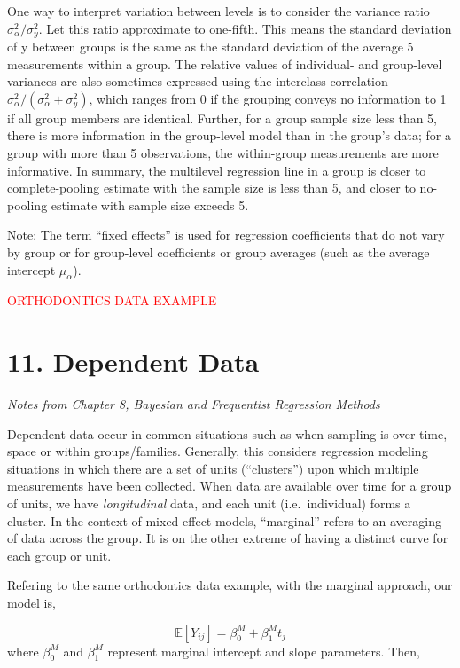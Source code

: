 \documentclass[12pt,]{article}
\begin{document}
One way to interpret variation between levels is to consider the
variance ratio \(\sigma_\alpha^2/ \sigma^2_y\). Let this ratio
approximate to one-fifth. This means the standard deviation of y between
groups is the same as the standard deviation of the average 5
measurements within a group. The relative values of individual- and
group-level variances are also sometimes expressed using the interclass
correlation \(\sigma^2_\alpha / (\sigma^2_\alpha + \sigma^2_y)\), which
ranges from 0 if the grouping conveys no information to 1 if all group
members are identical. Further, for a group sample size less than 5,
there is more information in the group-level model than in the group's
data; for a group with more than 5 observations, the within-group
measurements are more informative. In summary, the multilevel regression
line in a group is closer to complete-pooling estimate with the sample
size is less than 5, and closer to no-pooling estimate with sample size
exceeds 5.

Note: The term ``fixed effects'' is used for regression coefficients
that do not vary by group or for group-level coefficients or group
averages (such as the average intercept \(\mu_\alpha\)).

\textcolor{red}{ORTHODONTICS DATA EXAMPLE}

\section{11. Dependent Data}\label{dependent-data}

\emph{Notes from Chapter 8, Bayesian and Frequentist Regression Methods}

Dependent data occur in common situations such as when sampling is over
time, space or within groups/families. Generally, this considers
regression modeling situations in which there are a set of units
(``clusters'') upon which multiple measurements have been collected.
When data are available over time for a group of units, we have
\emph{longitudinal} data, and each unit (i.e.~individual) forms a
cluster. In the context of mixed effect models, ``marginal'' refers to
an averaging of data across the group. It is on the other extreme of
having a distinct curve for each group or unit.

Refering to the same orthodontics data example, with the marginal
approach, our model is,

\[\mathbb{E}[Y_{ij}] = \beta_0^M + \beta_1^Mt_j\] where \(\beta_0^M\)
and \(\beta_1^M\) represent marginal intercept and slope parameters.
Then,
\end{document}

